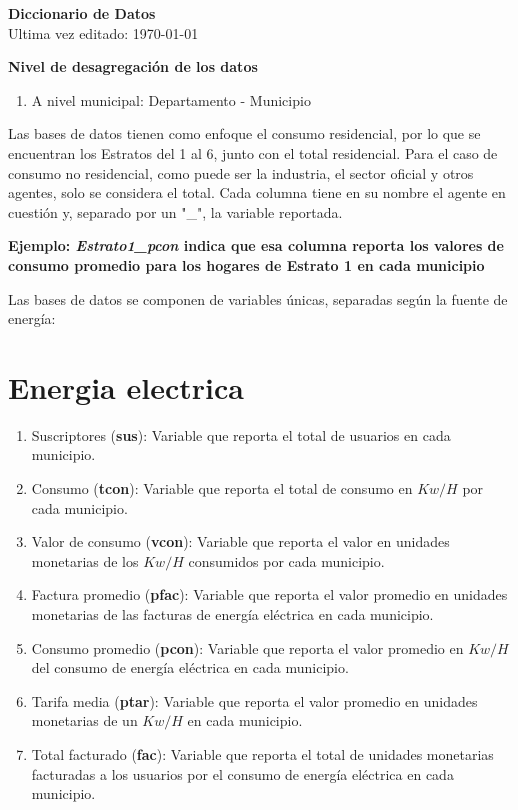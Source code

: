 \documentclass[12pt,a4paper]{article}
\begin{document}
\begin{center}
	\textbf{Diccionario de Datos} \\
	Ultima vez editado: \today
\end{center}
\vspace{10mm}

\textbf{Nivel de desagregación de los datos}
\begin{enumerate}
	\item A nivel municipal: Departamento - Municipio
\end{enumerate}

Las bases de datos tienen como enfoque el consumo residencial, por lo que se encuentran los Estratos del 1 al 6, junto con el total residencial. Para el caso de consumo no residencial, como puede ser la industria, el sector oficial y otros agentes, solo se considera el total. Cada columna tiene en su nombre el agente en cuestión y, separado por un "\_", la variable reportada.

\begin{center}
	\textbf{\textbf{Ejemplo}: \textit{Estrato1\_pcon }indica que esa columna reporta los valores de consumo promedio para los hogares de Estrato 1 en cada municipio} 
\end{center}

Las bases de datos se componen de variables únicas, separadas según la fuente de energía:

\section{Energia electrica}

\begin{enumerate}
	\item Suscriptores (\textbf{sus}): Variable que reporta el total de usuarios en cada municipio.
	\item Consumo (\textbf{tcon}): Variable que reporta el total de consumo en $Kw/H$ por cada municipio.
	\item Valor de consumo (\textbf{vcon}): Variable que reporta el valor en unidades monetarias de los $Kw/H$ consumidos por cada municipio.
	\item Factura promedio (\textbf{pfac}): Variable que reporta el valor promedio en unidades monetarias de las facturas de energía eléctrica en cada municipio.
	\item Consumo promedio (\textbf{pcon}): Variable que reporta el valor promedio en $Kw/H$ del consumo de energía eléctrica en cada municipio.
	\item Tarifa media (\textbf{ptar}): Variable que reporta el valor promedio en unidades monetarias de un $Kw/H$ en cada municipio.
	\item Total facturado (\textbf{fac}): Variable que reporta el total de unidades monetarias facturadas a los usuarios por el consumo de energía eléctrica en cada municipio.
\end{enumerate}
\end{document}
